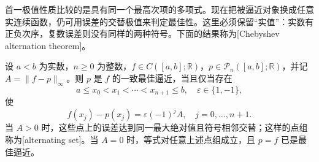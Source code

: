 首一极值性质比较的是具有同一个最高次项的多项式。现在把被逼近对象换成任意实连续函数，仍可用误差的交替极值来判定最佳性。这里必须保留“实值”：实数有正负次序，复数误差则没有同样的两种符号。下面的结果称为[Chebyshev alternation theorem]。

\begin{theorem}
\label{b2:thm:approximation-alternation}
设 \(a<b\) 为实数，\(n\geq0\) 为整数，\(f\in C([a,b];\mathbb R)\)，\(p\in\mathcal P_n([a,b];\mathbb R)\)，并记 \(A=\lVert f-p\rVert_\infty\)。则 \(p\) 是 \(f\) 的一致最佳逼近，当且仅当存在
\[
 a\leq x_0<x_1<\cdots<x_{n+1}\leq b,
 \quad \varepsilon\in\{1,-1\},
\]
使
\[
 f(x_j)-p(x_j)=\varepsilon(-1)^jA,
 \quad j=0,\ldots,n+1.
\]
当 \(A>0\) 时，这些点上的误差达到同一最大绝对值且符号相邻交替；这样的点组称为[alternating set]。当 \(A=0\) 时，等式对任意上述点组成立，且 \(p=f\) 已是最佳逼近。
\end{theorem}
